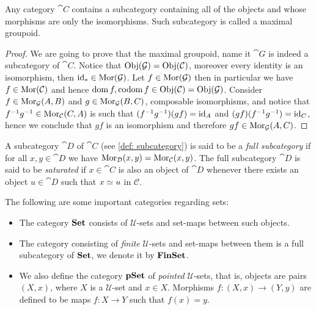 \begin{lemma}
Any category \(\cat C\) contains a subcategory containing all of the objects
and whose morphisms are only the isomorphisms. Such subcategory is called a
maximal groupoid.
\end{lemma}

\begin{proof}
We are going to prove that the maximal groupoid, name it \(\cat G\) is indeed
a subcategory of \(\cat C\). Notice that \(\operatorname{Obj}(\mathcal G) = \operatorname{Obj}(\mathcal C)\),
moreover every identity is an isomorphism, then \(\operatorname{id}_{*} \in \operatorname{Mor}(\mathcal G)\).
Let \(f \in \operatorname{Mor}(\mathcal G)\) then in particular we have \(f \in \operatorname{Mor}(\mathcal C)\)
and hence \(\operatorname{dom} f, \operatorname{codom} f \in \operatorname{Obj}(\mathcal C) =
\operatorname{Obj}(\mathcal G)\). Consider \(f \in \operatorname{Mor}_{\mathcal G}(A, B)\) and \(g \in \operatorname{Mor}_{\mathcal
G}(B, C)\), composable isomorphisms, and notice that \(f^{-1}  g^{-1}
\in \operatorname{Mor}_{\mathcal C}(C, A)\) is such that \((f^{-1}  g^{-1})  (g
f) = \operatorname{id}_A\) and \((g  f)  (f^{-1}  g^{-1}) = \operatorname{id}_C\), hence we
conclude that \(g  f\) is an isomorphism and therefore \(g  f \in
\operatorname{Mor}_{\mathcal G}(A, C)\).
\end{proof}

\begin{definition}\label{def: full subcategory}
A subcategory \(\cat D\) of \(\cat C\) (see \cref{def: subcategory}) is said to
be a \emph{full subcategory} if for all \(x, y \in \cat D\) we have
\(\operatorname{Mor}_{\mathcal D}(x, y) = \operatorname{Mor}_{\mathcal C}(x, y)\). The full subcategory \(\cat D\)
is said to be \emph{saturated} if \(x \in \cat C\) is also an object of \(\cat D\)
whenever there exists an object \(u \in \cat D\) such that \(x \simeq u\) in
\(\mathcal C\).
\end{definition}

\begin{example}
\label{exp:set-based-categories}
The following are some important categories regarding sets:
\begin{itemize}\setlength\itemsep{0em}
\item The category \({\textbf{Set}}\) consists of \(\mathcal U\)-sets and set-maps between
  such objects.
\item The category consisting of \emph{finite} \(\mathcal U\)-sets and set-maps
  between them is a full subcategory of \({\textbf{Set}}\), we denote it by \({\textbf{FinSet}}\).
\item We also define the category \({\textbf{pSet}}\) of \emph{pointed} \(\mathcal
  U\)-sets, that is, objects are pairs \((X, x)\), where \(X\) is a \(\mathcal
  U\)-set and \(x \in X\). Morphisms \(f: (X, x) \to (Y, y)\) are defined to be
  maps \(f: X \to Y\) such that \(f(x) = y\).
\end{itemize}
\end{example}

